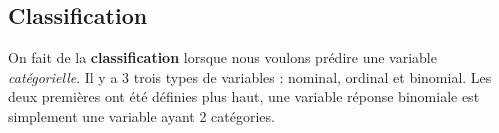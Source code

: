 \documentclass[10pt, french]{article}
\begin{document}
\begin{multicols*}{2}
%
%


\columnbreak
\section{Classification}
On fait de la \textbf{classification} lorsque nous voulons prédire une variable \textit{catégorielle}. Il y a 3 trois types de variables : nominal, ordinal et binomial. Les deux premières ont été définies plus haut, une variable réponse binomiale est simplement une variable ayant 2 catégories.


\end{multicols*}
\end{document}
